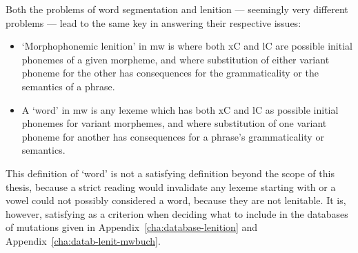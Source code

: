 Both the problems of word segmentation and lenition --- seemingly very different problems --- lead to the same key in answering their respective issues: 
\begin{itemize}
    \item `Morphophonemic lenition' in \gls{mw} is where both \gls{x}\gls{C}  and \gls{l}\gls{C} are possible initial phonemes of a given morpheme, and where  substitution of either variant phoneme for the other has consequences for the grammaticality or the semantics of a phrase.
    \item A `word' in \gls{mw} is any lexeme which has both \gls{x}\gls{C} and \gls{l}\gls{C} as possible initial phonemes for variant morphemes, and where  substitution of one variant phoneme for another has consequences for a phrase's grammaticality or semantics.
\end{itemize}
This definition of `word' is not a satisfying definition beyond the scope of this thesis, because a strict reading would invalidate any lexeme starting with  or a vowel could not possibly considered a word, because they are not lenitable. It is, however, satisfying as a criterion when deciding what to include in the databases of mutations given in Appendix~\ref{cha:database-lenition} and Appendix~\ref{cha:datab-lenit-mwbuch}.


